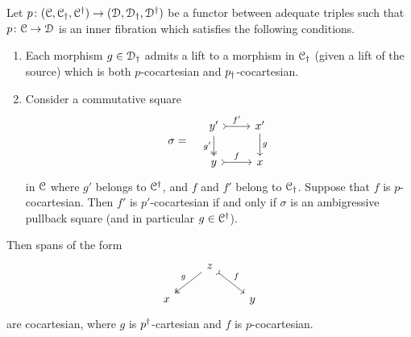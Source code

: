 \documentclass[main.tex]{subfiles}
\begin{document}
\begin{theorem}
  \label{thm:old_barwick}
  Let $p\colon (\mathcal{C}, \mathcal{C}_{\dagger}, \mathcal{C}^{\dagger}) \to (\mathcal{D}, \mathcal{D}_{\dagger}, \mathcal{D}^{\dagger})$ be a functor between adequate triples such that $p\colon \mathcal{C} \to \mathcal{D}$ is an inner fibration which satisfies the following conditions.
  \begin{enumerate}
    \item Each morphism $g \in \mathcal{D}_{\dagger}$ admits a lift to a morphism in $\mathcal{C}_{\dagger}$ (given a lift of the source) which is both $p$-cocartesian and $p_{\dagger}$-cocartesian.

    \item Consider a commutative square
      \begin{equation*}
        \sigma = \quad
        \begin{tikzcd}
          y'
          \arrow[r, rightarrowtail, "f'"]
          \arrow[d, two heads, swap, "g'"]
          & x'
          \arrow[d, "g"]
          \\
          y
          \arrow[r, rightarrowtail, "f"]
          & x
        \end{tikzcd}
      \end{equation*}
      in $\mathcal{C}$ where $g'$ belongs to $\mathcal{C}^{\dagger}$, and $f$ and $f'$ belong to $\mathcal{C}_{\dagger}$. Suppose that $f$ is $p$-cocartesian. Then $f'$ is $p'$-cocartesian if and only if $\sigma$ is an ambigressive pullback square (and in particular $g \in \mathcal{C}^{\dagger}$).
  \end{enumerate}

  Then spans of the form
  \begin{equation*}
    \begin{tikzcd}
      & z
      \arrow[dl, two heads, swap, "g"]
      \arrow[dr, rightarrowtail, "f"]
      \\
      x
      && y
    \end{tikzcd}
  \end{equation*}
  are cocartesian, where $g$ is $p^{\dagger}$-cartesian and $f$ is $p$-cocartesian.
\end{theorem}
\end{document}
